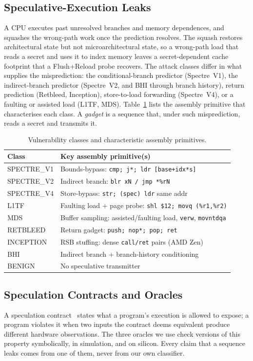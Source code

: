 \documentclass[conference]{IEEEtran}
\begin{document}
\subsection{Speculative-Execution Leaks}
A CPU executes past unresolved branches and memory dependences, and squashes
the wrong-path work once the prediction resolves. The squash restores
architectural state but not microarchitectural state, so a wrong-path load that
reads a secret and uses it to index memory leaves a secret-dependent cache
footprint that a Flush+Reload probe recovers. The attack classes differ in what
supplies the misprediction: the conditional-branch predictor (Spectre~V1), the
indirect-branch predictor (Spectre~V2, and BHI through branch history), return
prediction (Retbleed, Inception), store-to-load forwarding (Spectre~V4), or a
faulting or assisted load (L1TF, MDS). Table~\ref{tab:classes} lists the
assembly primitive that characterises each class. A \emph{gadget} is a
sequence that, under such misprediction, reads a secret and transmits it.

\begin{table}[t]
\centering
\caption{Vulnerability classes and characteristic assembly primitives.}
\label{tab:classes}
\small
\begin{tabularx}{\columnwidth}{@{}lX@{}}
\toprule
Class & Key assembly primitive(s) \\
\midrule
SPECTRE\_V1   & Bounds-bypass: \texttt{cmp; j*; ldr [base+idx*s]} \\
SPECTRE\_V2   & Indirect branch: \texttt{blr xN / jmp *\%rN} \\
SPECTRE\_V4   & Store-bypass: \texttt{str; (spec) ldr} same addr \\
L1TF          & Faulting load + page probe: \texttt{shl \$12; movq (\%r1,\%r2)} \\
MDS           & Buffer sampling: assisted/faulting load, \texttt{verw}, \texttt{movntdqa} \\
RETBLEED      & Return gadget: \texttt{push; nop*; pop; ret} \\
INCEPTION     & RSB stuffing: dense \texttt{call/ret} pairs (AMD Zen) \\
BHI           & Indirect branch + branch-history conditioning \\
BENIGN        & No speculative transmitter \\
\bottomrule
\end{tabularx}
\end{table}

\subsection{Speculation Contracts and Oracles}
\label{sec:oracles}
A speculation contract~\cite{guarnieri2021contracts} states what a program's
execution is allowed to expose; a program violates it when two inputs the
contract deems equivalent produce different hardware observations. The three
oracles we use check versions of this property symbolically, in simulation, and
on silicon. Every claim that a sequence leaks comes from one of them, never
from our own classifier.
\end{document}
